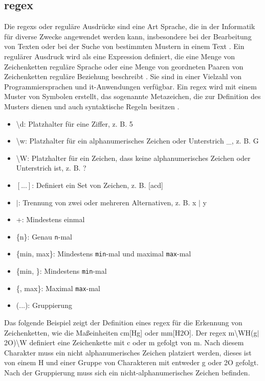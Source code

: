 \subsection{\acs{regex}} \label{sec:regex}

Die \acfp{regex} oder reguläre Ausdrücke sind eine Art Sprache, die in der Informatik für diverse Zwecke angewendet werden kann, insbesondere bei der Bearbeitung von Texten oder bei der Suche von bestimmten Mustern in einem Text \cite{regexconf}. Ein regulärer Ausdruck wird als eine Expression definiert, die eine Menge von Zeichenketten \glqq reguläre Sprache\grqq{} oder eine Menge von geordneten Paaren von Zeichenketten \glqq reguläre Beziehung\grqq{} beschreibt \cite{regexhandbook}. Sie sind in einer Vielzahl von Programmiersprachen und \ac{it}-Anwendungen verfügbar. Ein \ac{regex} wird mit einem Muster von Symbolen erstellt, das sogenannte Metazeichen, die zur Definition des Musters dienen und auch syntaktische Regeln besitzen \cite{regexweb1}.

\begin{itemize}
	\item \textbackslash d: Platzhalter für eine Ziffer, z. B. 5
	\item \textbackslash w: Platzhalter für ein alphanumerisches Zeichen oder Unterstrich \glqq\_\grqq{}, z. B. G
	\item \textbackslash W: Platzhalter für ein Zeichen, dass keine alphanumerisches Zeichen oder Unterstrich ist, z. B. ?
	\item $[...]$: Definiert ein Set von Zeichen, z. B.  [acd]
	\item $\vert$:  Trennung von zwei oder mehreren Alternativen, z. B. x $\vert$ y
	\item +: Mindestens einmal
	\item \{n\}: Genau \texttt{n}-mal
	\item \{min, max\}: Mindestens \texttt{min}-mal und maximal \texttt{max}-mal	
	\item \{min, \}: Mindestens \texttt{min}-mal
	\item \{, max\}: Maximal \texttt{max}-mal
	\item (...): Gruppierung
\end{itemize}

Das folgende Beispiel zeigt der Definition eines \ac{regex} für die Erkennung von Zeichenketten, wie die Maßeinheiten cm[Hg] oder mm[H2O]. Der \ac{regex} \glqq[cm]m\textbackslash WH(g$\vert$2O)\textbackslash W\grqq{} definiert eine Zeichenkette mit \glqq c\grqq{} oder \glqq m\grqq{} gefolgt von \glqq m\grqq{}. Nach diesem Charakter muss ein nicht alphanumerisches Zeichen platziert werden, dieses ist von einem \glqq H\grqq{} und einer Gruppe von Charakteren mit entweder \glqq g\grqq{} oder \glqq 2O\grqq{} gefolgt. Nach der Gruppierung muss sich ein nicht-alphanumerisches Zeichen befinden.